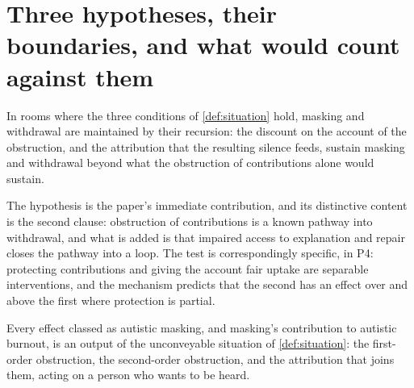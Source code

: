 \section{Three hypotheses, their boundaries, and what would count against them}\label{sec:hypothesis}

\begin{hypothesis}\label{hyp:mechanism}
In rooms where the three conditions of \autoref{def:situation} hold, masking and withdrawal are maintained by their recursion: the discount on the account of the obstruction, and the attribution that the resulting silence feeds, sustain masking and withdrawal beyond what the obstruction of contributions alone would sustain.
\end{hypothesis}

The hypothesis is the paper's immediate contribution, and its distinctive content is the second clause: obstruction of contributions is a known pathway into withdrawal, and what is added is that impaired access to explanation and repair closes the pathway into a loop. The test is correspondingly specific, in P4: protecting contributions and giving the account fair uptake are separable interventions, and the mechanism predicts that the second has an effect over and above the first where protection is partial.

\begin{hypothesis}\label{hyp:root}
Every effect classed as autistic masking, and masking's contribution to autistic burnout, is an output of the unconveyable situation of \autoref{def:situation}: the first-order obstruction, the second-order obstruction, and the attribution that joins them, acting on a person who wants to be heard.
\end{hypothesis}


